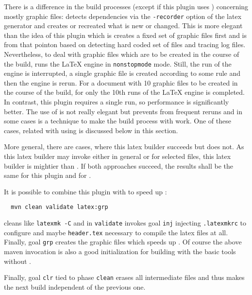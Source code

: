 There is a difference in the build processes (except if this plugin uses ) 
concerning mostly graphic files: 
 detects dependencies via the \texttt{-recorder} option of the latex generator 
and creates or recreated what is new or changed. 
This is more elegant than the idea of this plugin 
which is creates a fixed set of graphic files first 
and is from that pointon based on detecting hard coded set of files and tracing log files. 
Nevertheless, to deal with graphic files which are to be created in the course of the build, 
 runs the \LaTeX{} engine in \texttt{nonstopmode} mode. 
Still, the run of the engine is interrupted, a single graphic file is created according to some rule 
and then the engine is rerun. 
For a document with 10 graphic files to be created in the course of the build, 
for  only the 10th runs of the \LaTeX{} engine is completed. 
In contrast, this plugin requires a single run, so performance is significantly better. 
The use of  is not really elegant but prevents  from frequent reruns 
and in some cases is a technique to make the build process with  work. 
One of these cases, related with using  is discussed below in this section. 

More general, there are cases, where this latex builder succeeds but  does not. 
As this latex builder may invoke  either in general or for selected files, 
this latex builder is mightier than . 
If both approaches succeed, the results shall be the same for this plugin and for . 

It is possible to combine this plugin with  to speed up : 
%
\begin{Verbatim}
  mvn clean validate latex:grp
\end{Verbatim}
%
cleans like \texttt{latexmk -C} and in \texttt{validate} 
invokes goal \texttt{inj} injecting \texttt{.latexmkrc} to configure  
and maybe \texttt{header.tex} necessary to compile the latex files at all. 
Finally, goal \texttt{grp} creates the graphic files which speeds up . 
Of course the above maven invocation is also a good initialization 
for building with the basic tools without . 

Finally, goal \texttt{clr} tied to phase \texttt{clean} erases all intermediate files 
and thus makes the next build independent of the previous one. 


